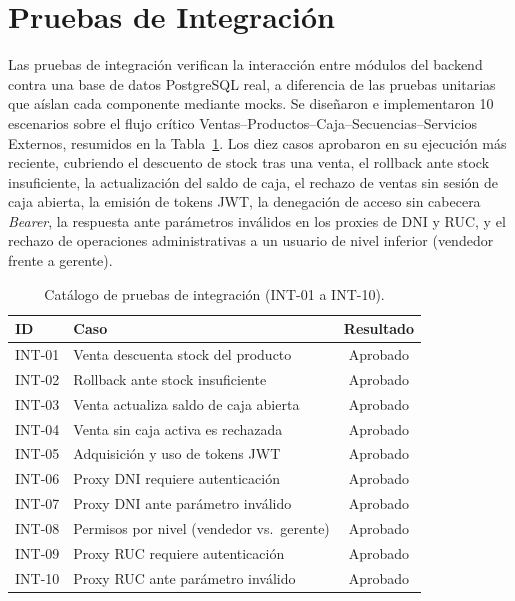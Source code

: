 \documentclass[conference]{IEEEtran}
\begin{document}
\section{Pruebas de Integración}
\label{sec:integration}

Las pruebas de integración verifican la interacción entre módulos del backend contra una base de datos PostgreSQL real, a diferencia de las pruebas unitarias que aíslan cada componente mediante mocks. Se diseñaron e implementaron 10 escenarios sobre el flujo crítico Ventas--Productos--Caja--Secuencias--Servicios Externos, resumidos en la Tabla~\ref{tab:integration}. Los diez casos aprobaron en su ejecución más reciente, cubriendo el descuento de stock tras una venta, el rollback ante stock insuficiente, la actualización del saldo de caja, el rechazo de ventas sin sesión de caja abierta, la emisión de tokens JWT, la denegación de acceso sin cabecera \emph{Bearer}, la respuesta ante parámetros inválidos en los proxies de DNI y RUC, y el rechazo de operaciones administrativas a un usuario de nivel inferior (vendedor frente a gerente).

\begin{table}[htbp]
  \caption{Catálogo de pruebas de integración (INT-01 a INT-10).}
  \label{tab:integration}
  \centering
  \footnotesize
  \begin{tabular}{l p{5.6cm} c}
    \toprule
    \textbf{ID} & \textbf{Caso} & \textbf{Resultado} \\
    \midrule
    INT-01 & Venta descuenta stock del producto & Aprobado \\
    INT-02 & Rollback ante stock insuficiente & Aprobado \\
    INT-03 & Venta actualiza saldo de caja abierta & Aprobado \\
    INT-04 & Venta sin caja activa es rechazada & Aprobado \\
    INT-05 & Adquisición y uso de tokens JWT & Aprobado \\
    INT-06 & Proxy DNI requiere autenticación & Aprobado \\
    INT-07 & Proxy DNI ante parámetro inválido & Aprobado \\
    INT-08 & Permisos por nivel (vendedor vs.\ gerente) & Aprobado \\
    INT-09 & Proxy RUC requiere autenticación & Aprobado \\
    INT-10 & Proxy RUC ante parámetro inválido & Aprobado \\
    \bottomrule
  \end{tabular}
\end{table}
\end{document}
